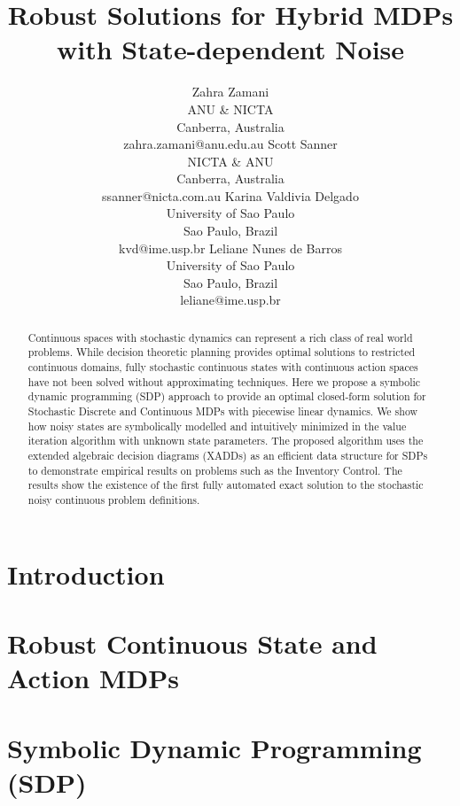 \documentclass{article}
\title{	Robust Solutions for Hybrid MDPs with State-dependent Noise }
\author{Zahra Zamani\\
ANU \& NICTA\\
Canberra, Australia\\
zahra.zamani@anu.edu.au
\And
Scott Sanner\\
NICTA \& ANU\\
Canberra, Australia\\
ssanner@nicta.com.au
\And
Karina Valdivia Delgado\\
University of Sao Paulo\\
Sao Paulo, Brazil\\
kvd@ime.usp.br
\And
Leliane Nunes de Barros\\
University of Sao Paulo\\
Sao Paulo, Brazil\\
leliane@ime.usp.br}
\begin{document}
\maketitle

\begin{abstract}
Continuous spaces  with stochastic dynamics can represent a rich class of real world problems. While decision theoretic planning provides optimal solutions to restricted continuous domains, fully stochastic continuous states with continuous action spaces have not been solved without approximating techniques. Here we propose a symbolic dynamic programming (SDP) approach to provide an optimal closed-form solution for Stochastic Discrete and Continuous MDPs with piecewise linear dynamics. We show how noisy states are symbolically modelled and intuitively minimized in the value iteration algorithm with unknown state parameters. The proposed algorithm uses the extended algebraic decision diagrams (XADDs) as an efficient data structure for SDPs to demonstrate empirical results on problems such as the Inventory Control. The results show the existence of the first fully automated exact solution to the stochastic noisy continuous problem definitions. 

\end{abstract}

\section{Introduction}



\section{Robust Continuous State and Action MDPs}



\section{Symbolic Dynamic Programming (SDP)} %


\end{document}

